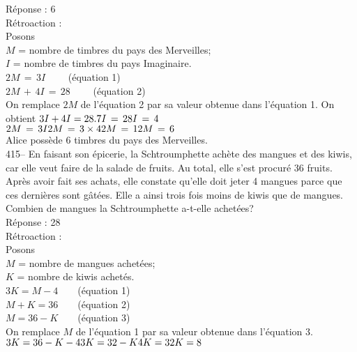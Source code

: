 ﻿\documentclass[letterpaper, 12pt]{article}
\begin{document}
R\'eponse : 6\\

R\'etroaction : \\
Posons\\
$M$ = nombre de timbres du pays des Merveilles;\\
$I$ = nombre de timbres du pays Imaginaire.\\

$2M\,=\,3I \qquad $ (\'equation 1)\\
$2M\,+\,4I\,=\,28 \qquad $ (\'equation 2)\\
On remplace $2M$ de l'\'equation 2 par sa valeur obtenue dans
l'\'equation 1. On obtient $3I+4I=28.\\
7I\,=\,28\\
I\,=\,4$\\

$2M\,=\,3I\\
2M\,=\,3\times4\\
2M\,=\,12\\
M\,=\,6$\\
Alice poss\`ede 6 timbres du pays des Merveilles.\\

415-- En faisant son \'epicerie, la Schtroumphette ach\`ete des mangues et
des kiwis, car elle veut faire de la salade de fruits.  Au total, elle s'est
procur\'e 36 fruits.  Apr\`es avoir fait ses achats, elle constate qu'elle
doit jeter 4 mangues parce que ces derni\`eres sont g\^at\'ees. Elle a ainsi
trois fois moins de kiwis que de mangues.  Combien de mangues la
Schtroumphette a-t-elle achet\'ees?\\


R\'eponse : 28\\

R\'etroaction : \\
Posons\\
$M$ = nombre de mangues achet\'ees;\\
$K$ = nombre de kiwis achet\'es.\\

$3K=M-4 \qquad $(\'equation 1)\\
$M+K=36 \qquad $(\'equation 2)\\

$M=36-K\qquad $(\'equation 3)\\

On remplace $M$ de l'\'equation 1 par sa valeur obtenue dans l'\'equation
3.\\
$3K=36-K-4\\
3K=32-K\\
4K=32\\
K=8$\\
\end{document}
